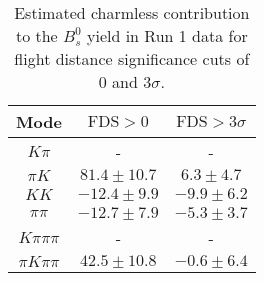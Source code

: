 \begin{table}[h]
  \centering
  \begin{tabular}{ccc}
      \toprule
      Mode & $\mathrm{FDS} > 0$ & $\mathrm{FDS} > 3\sigma$ \\
      \midrule
      $K\pi$ & \-- & \-- \\
      $\pi K$ & $81.4 \pm 10.7$ & $6.3 \pm 4.7$ \\
      $KK$ & $-12.4 \pm 9.9$ & $-9.9 \pm 6.2$ \\
      $\pi\pi$ & $-12.7 \pm 7.9$ & $-5.3 \pm 3.7$ \\
      $K\pi\pi\pi$ & \-- & \-- \\
      $\pi K\pi\pi$ & $42.5 \pm 10.8$ & $-0.6 \pm 6.4$ \\
      \bottomrule
  \end{tabular}
  \caption{\small Estimated charmless contribution to the $B^{0}_{s}$ yield in Run 1 data for flight distance significance cuts of 0  and $3\sigma$.}
\label{tab:charmless_yields_Bs_run_1}
\end{table}
